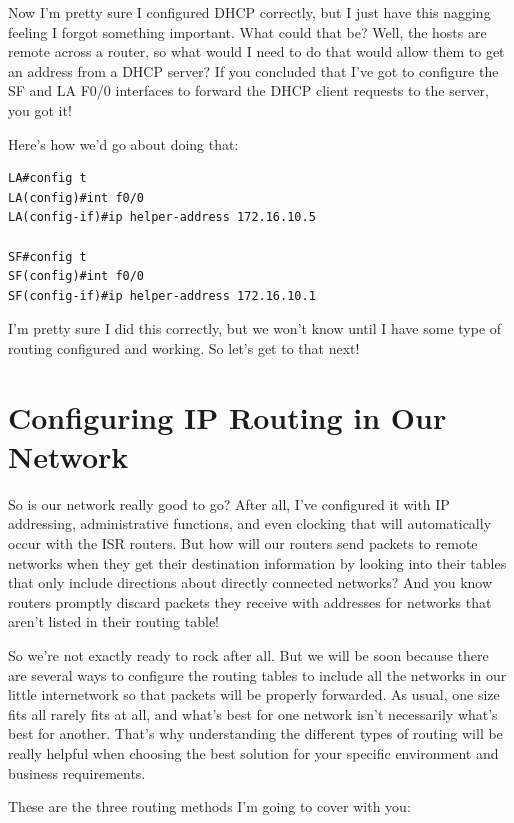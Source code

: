 Now I'm pretty sure I configured DHCP correctly, but I just have this
nagging feeling I forgot something important. What could that be? Well,
the hosts are remote across a router, so what would I need to do that
would allow them to get an address from a DHCP server? If you concluded
that I've got to configure the SF and LA F0/0 interfaces to forward the
DHCP client requests to the server, you got it!

Here's how we'd go about doing that:

\begin{verbatim}
LA#config t
LA(config)#int f0/0
LA(config-if)#ip helper-address 172.16.10.5

SF#config t
SF(config)#int f0/0
SF(config-if)#ip helper-address 172.16.10.1
\end{verbatim}

I'm pretty sure I did this correctly, but we won't know until I have
some type of routing configured and working. So let's get to that next!



\section{Configuring IP Routing in Our Network}

So is our network really good to go? After all, I've configured it with
IP addressing, administrative functions, and even clocking that will
automatically occur with the ISR routers. But how will our routers send
packets to remote networks when they get their destination
\protect\hypertarget{c09.xhtmlux5cux23Page_382}{}{}information by
looking into their tables that only include directions about directly
connected networks? And you know routers promptly discard packets they
receive with addresses for networks that aren't listed in their routing
table!

So we're not exactly ready to rock after all. But we will be soon
because there are several ways to configure the routing tables to
include all the networks in our little internetwork so that packets will
be properly forwarded. As usual, one size fits all rarely fits at all,
and what's best for one network isn't necessarily what's best for
another. That's why understanding the different types of routing will be
really helpful when choosing the best solution for your specific
environment and business requirements.

These are the three routing methods I'm going to cover with you:

